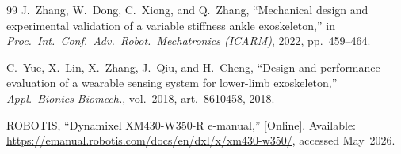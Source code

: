 \documentclass[conference]{IEEEtran}
\begin{document}
\begin{thebibliography}{99}
 J.~Zhang, W.~Dong, C.~Xiong, and Q.~Zhang, ``Mechanical design and experimental validation of a variable stiffness ankle exoskeleton,'' in \emph{Proc.~Int.~Conf.~Adv.~Robot.~Mechatronics (ICARM)}, 2022, pp.~459--464.

 C.~Yue, X.~Lin, X.~Zhang, J.~Qiu, and H.~Cheng, ``Design and performance evaluation of a wearable sensing system for lower-limb exoskeleton,'' \emph{Appl.~Bionics Biomech.}, vol.~2018, art.~8610458, 2018.

 ROBOTIS, ``Dynamixel XM430-W350-R e-manual,'' [Online]. Available: \url{https://emanual.robotis.com/docs/en/dxl/x/xm430-w350/}, accessed May~2026.

\end{thebibliography}
\end{document}
